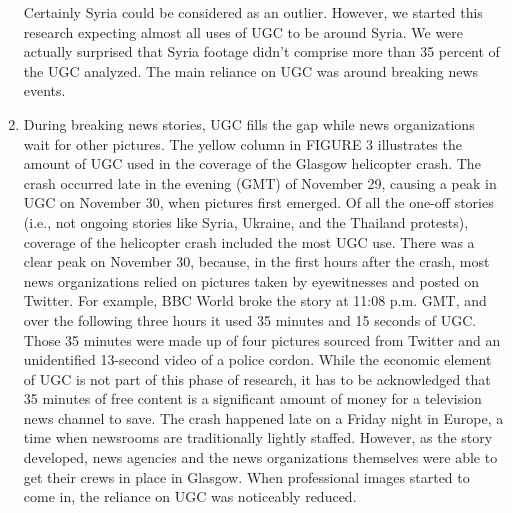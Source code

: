 \documentclass[symmetric, notoc, nobib]{towcenter-book}
\begin{document}
\begin{enumerate}
Certainly Syria could be considered as an outlier. However, we started this
research expecting almost all uses of UGC to be around Syria. We were
actually surprised that Syria footage didn't comprise more than 35 percent
of the UGC analyzed. The main reliance on UGC was around breaking
news events.
\item During breaking news stories, UGC fills the gap while news
organizations wait for other pictures.
The yellow column in FIGURE 3 illustrates the amount of UGC used in
the coverage of the Glasgow helicopter crash. The crash occurred late in
the evening (GMT) of November 29, causing a peak in UGC on November
30, when pictures first emerged. Of all the one-off stories (i.e., not ongoing
stories like Syria, Ukraine, and the Thailand protests), coverage of the helicopter
crash included the most UGC use.
There was a clear peak on November 30, because, in the first hours after the
crash, most news organizations relied on pictures taken by eyewitnesses
and posted on Twitter. For example, BBC World broke the story at 11:08
p.m. GMT, and over the following three hours it used 35 minutes and 15
seconds of UGC. Those 35 minutes were made up of four pictures sourced
from Twitter and an unidentified 13-second video of a police cordon. While
the economic element of UGC is not part of this phase of research, it has to
be acknowledged that 35 minutes of free content is a significant amount of
money for a television news channel to save.
The crash happened late on a Friday night in Europe, a time when newsrooms
are traditionally lightly staffed. However, as the story developed,
news agencies and the news organizations themselves were able to get their
crews in place in Glasgow. When professional images started to come in,
the reliance on UGC was noticeably reduced.


\end{enumerate}
\end{document}
